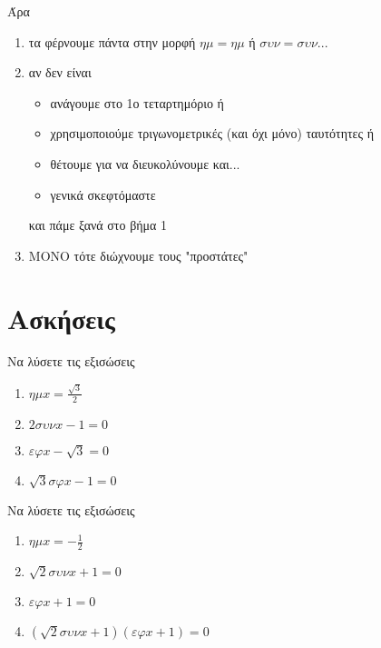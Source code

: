 \documentclass{../presentation}
\begin{document}
\begin{frame}
  Άρα
  \begin{enumerate}
    \item<1-> τα φέρνουμε πάντα στην μορφή $ημ=ημ$ ή $συν=συν$...
    \item<2-> αν δεν είναι
          \begin{itemize}
            \item<3-> ανάγουμε στο 1ο τεταρτημόριο ή
            \item<4-> χρησιμοποιούμε τριγωνομετρικές (και όχι μόνο) ταυτότητες ή
            \item<5-> θέτουμε για να διευκολύνουμε και...
            \item<6-> γενικά σκεφτόμαστε
          \end{itemize}

           και πάμε ξανά στο βήμα 1

    \item<8-> ΜΟΝΟ τότε διώχνουμε τους "προστάτες"
  \end{enumerate}
\end{frame}

\section{Ασκήσεις}
\begin{askisi}
  Να λύσετε τις εξισώσεις
  \begin{enumerate}
    \item<1-> $ημx=\frac{\sqrt{3}}{2}$
    \item<2-> $2συνx-1=0$
    \item<3-> $εφx-\sqrt{3}=0$
    \item<4-> $\sqrt{3}σφx-1=0$
  \end{enumerate}

\end{askisi}

\begin{askisi}
  Να λύσετε τις εξισώσεις
  \begin{enumerate}
    \item<1-> $ημx=-\frac{1}{2}$
    \item<2-> $\sqrt{2}συνx+1=0$
    \item<3-> $εφx+1=0$
    \item<4-> $(\sqrt{2}συνx+1)(εφx+1)=0$
  \end{enumerate}

\end{askisi}
\end{document}
